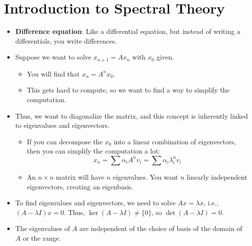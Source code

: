 \documentclass[../../notes.tex]{subfiles}
\begin{document}
\chapter{Introduction to Spectral Theory}
\begin{itemize}
    \item {}\textbf{Difference equation}: Like a differential equation, but instead of writing a differentials, you write differences.
    \item Suppose we want to solve $x_{n+1}=Ax_n$ with $x_0$ given.
    \begin{itemize}
        \item You will find that $x_n=A^nx_0$.
        \item This gets hard to compute, so we want to find a way to simplify the computation.
    \end{itemize}
    \item Thus, we want to diagonalize the matrix, and this concept is inherently linked to eigenvalues and eigenvectors.
    \begin{itemize}
        \item If you can decompose the $x_0$ into a linear combination of eigenvectors, then you can simplify the computation a lot:
        \begin{equation*}
            x_n = \sum\alpha_iA^nv_i = \sum\alpha_i\lambda_i^nv_i
        \end{equation*}
        \item An $n\times n$ matrix will have $n$ eigenvalues. You want $n$ linearly independent eigenvectors, creating an eigenbasis.
    \end{itemize}
    \item To find eigenvalues and eigenvectors, we need to solve $Ax=\lambda x$, i.e., $(A-\lambda I)x=0$. Thus, $\ker(A-\lambda I)\neq\{0\}$, so $\det(A-\lambda I)=0$.
    \item The eigenvalues of $A$ are independent of the choice of basis of the domain of $A$ or the range.
\end{itemize}
\end{document}

